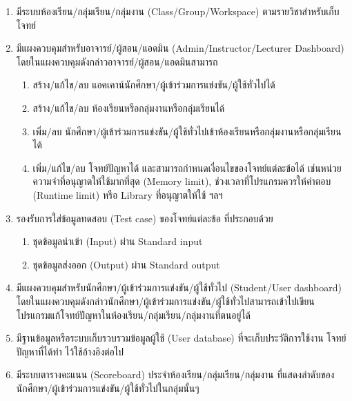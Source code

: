 \documentclass[12pt,one side,openright,a4paper]{cpe-thesis-th}
\begin{document}
\begin{enumerate}
  \item มีระบบห้องเรียน/กลุ่มเรียน/กลุ่มงาน (Class/Group/Workspace) ตามรายวิชาสำหรับเก็บโจทย์
  \item มีแผงควบคุมสำหรับอาจารย์/ผู้สอน/แอดมิน (Admin/Instructor/Lecturer Dashboard) โดยในแผงควบคุมดังกล่าวอาจารย์/ผู้สอน/แอดมินสามารถ
        \begin{enumerate}
          \item สร้าง/แก้ไข/ลบ แอคเคาน์นักศึกษา/ผู้เข้าร่วมการแข่งขัน/ผู้ใช้ทั่วไปได้
          \item สร้าง/แก้ไข/ลบ ห้องเรียนหรือกลุ่มงานหรือกลุ่มเรียนได้
          \item เพิ่ม/ลบ นักศึกษา/ผู้เข้าร่วมการแข่งขัน/ผู้ใช้ทั่วไปเข้าห้องเรียนหรือกลุ่มงานหรือกลุ่มเรียนได้
          \item เพิ่ม/แก้ไข/ลบ โจทย์ปัญหาได้ และสามารถกำหนดเงื่อนไขของโจทย์แต่ละข้อได้ เช่นหน่วยความจำที่อนุญาตให้ใช้มากที่สุด (Memory limit), ช่วงเวลาที่โปรแกรมควรให้คำตอบ (Runtime limit) หรือ Library ที่อนุญาตให้ใช้ ฯลฯ
        \end{enumerate}
  \item รองรับการใส่ข้อมูลทดสอบ (Test case) ของโจทย์แต่ละข้อ ที่ประกอบด้วย
        \begin{enumerate}
          \item ชุดข้อมูลนำเข้า (Input) ผ่าน Standard input
          \item ชุดข้อมูลส่งออก (Output) ผ่าน Standard output
        \end{enumerate}
  \item มีแผงควบคุมสำหรับนักศึกษา/ผู้เข้าร่วมการแข่งขัน/ผู้ใช้ทั่วไป (Student/User dashboard) โดยในแผงควบคุมดังกล่าวนักศึกษา/ผู้เข้าร่วมการแข่งขัน/ผู้ใช้ทั่วไปสามารถเข้าไปเขียนโปรแกรมแก้โจทย์ปัญหาในห้องเรียน/กลุ่มเรียน/กลุ่มงานที่ตนอยู่ได้
  \item มีฐานข้อมูลหรือระบบเก็บรวบรวมข้อมูลผู้ใช้ (User database) ที่จะเก็บประวัติการใช้งาน โจทย์ปัญหาที่ได้ทำ ไว้ใช้อ้างอิงต่อไป
  \item มีระบบตารางคะแนน (Scoreboard) ประจำห้องเรียน/กลุ่มเรียน/กลุ่มงาน ที่แสดงลำดับของนักศึกษา/ผู้เข้าร่วมการแข่งขัน/ผู้ใช้ทั่วไปในกลุ่มนั้นๆ
\end{enumerate}
\end{document}
